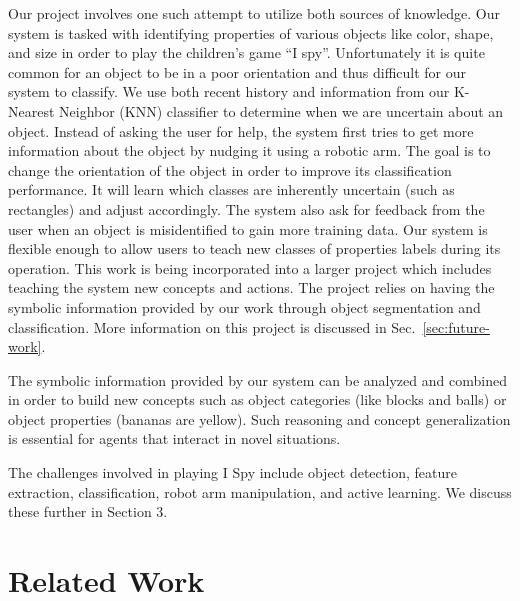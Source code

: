 \documentclass[11pt]{article}
\newcommand{\xxx}[1]{{\bf \color{red} #1}}
\begin{document}
Our project involves one such attempt to utilize both sources of knowledge.
Our system is tasked with identifying properties of various objects like
color, shape, and size in order to play the children's game ``I spy''.
Unfortunately it is quite common for an object to be in a poor orientation and
thus difficult for our system to classify. We use both recent history and
information from our K-Nearest Neighbor (KNN) classifier to determine when we
are uncertain about an object. Instead of asking the user for help, the system
first tries to get more information about the object by nudging it using a
robotic arm. The goal is to change the orientation of the object in order to
improve its classification performance. It will learn which classes are
inherently uncertain (such as rectangles) and adjust accordingly. The system also
ask for feedback from the user when an object is misidentified to gain more
training data. Our system is flexible enough to allow users to teach new
classes of properties labels during its operation. This work is being incorporated
into a larger project which includes teaching the system new concepts and actions.
The project relies on having the symbolic information provided by our work through
object segmentation and classification. More information on this project is
discussed in Sec.~\ref{sec:future-work}.

The symbolic information provided by our system can be analyzed and combined in
order to build new concepts such as object categories (like blocks and balls)
or object properties (bananas are yellow). Such reasoning and concept generalization
is essential for agents that interact in novel situations.

The challenges involved in playing I Spy include object detection, feature
extraction, classification, robot arm manipulation, and active learning. We
discuss these further in Section 3.

\section{Related Work}
\end{document}
